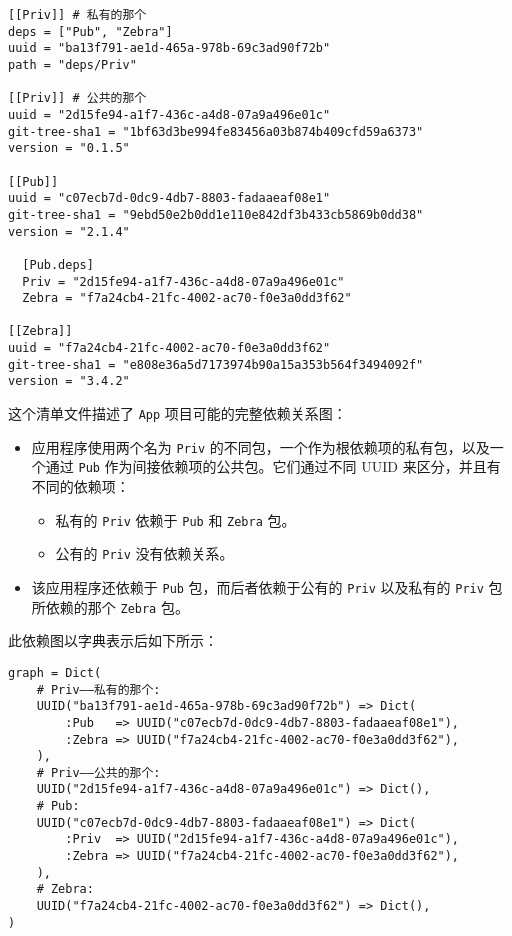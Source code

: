 \begin{lstlisting}
[[Priv]] # 私有的那个
deps = ["Pub", "Zebra"]
uuid = "ba13f791-ae1d-465a-978b-69c3ad90f72b"
path = "deps/Priv"

[[Priv]] # 公共的那个
uuid = "2d15fe94-a1f7-436c-a4d8-07a9a496e01c"
git-tree-sha1 = "1bf63d3be994fe83456a03b874b409cfd59a6373"
version = "0.1.5"

[[Pub]]
uuid = "c07ecb7d-0dc9-4db7-8803-fadaaeaf08e1"
git-tree-sha1 = "9ebd50e2b0dd1e110e842df3b433cb5869b0dd38"
version = "2.1.4"

  [Pub.deps]
  Priv = "2d15fe94-a1f7-436c-a4d8-07a9a496e01c"
  Zebra = "f7a24cb4-21fc-4002-ac70-f0e3a0dd3f62"

[[Zebra]]
uuid = "f7a24cb4-21fc-4002-ac70-f0e3a0dd3f62"
git-tree-sha1 = "e808e36a5d7173974b90a15a353b564f3494092f"
version = "3.4.2"
\end{lstlisting}



这个清单文件描述了 \texttt{App} 项目可能的完整依赖关系图：



\begin{itemize}
\item 应用程序使用两个名为 \texttt{Priv} 的不同包，一个作为根依赖项的私有包，以及一个通过 \texttt{Pub} 作为间接依赖项的公共包。它们通过不同 UUID 来区分，并且有不同的依赖项：

\begin{itemize}
\item 私有的 \texttt{Priv} 依赖于 \texttt{Pub} 和 \texttt{Zebra} 包。


\item 公有的 \texttt{Priv} 没有依赖关系。

\end{itemize}

\item 该应用程序还依赖于 \texttt{Pub} 包，而后者依赖于公有的 \texttt{Priv} 以及私有的 \texttt{Priv} 包所依赖的那个 \texttt{Zebra} 包。

\end{itemize}


此依赖图以字典表示后如下所示：




\begin{verbatim}
graph = Dict(
    # Priv——私有的那个:
    UUID("ba13f791-ae1d-465a-978b-69c3ad90f72b") => Dict(
        :Pub   => UUID("c07ecb7d-0dc9-4db7-8803-fadaaeaf08e1"),
        :Zebra => UUID("f7a24cb4-21fc-4002-ac70-f0e3a0dd3f62"),
    ),
    # Priv——公共的那个:
    UUID("2d15fe94-a1f7-436c-a4d8-07a9a496e01c") => Dict(),
    # Pub:
    UUID("c07ecb7d-0dc9-4db7-8803-fadaaeaf08e1") => Dict(
        :Priv  => UUID("2d15fe94-a1f7-436c-a4d8-07a9a496e01c"),
        :Zebra => UUID("f7a24cb4-21fc-4002-ac70-f0e3a0dd3f62"),
    ),
    # Zebra:
    UUID("f7a24cb4-21fc-4002-ac70-f0e3a0dd3f62") => Dict(),
)
\end{verbatim}



